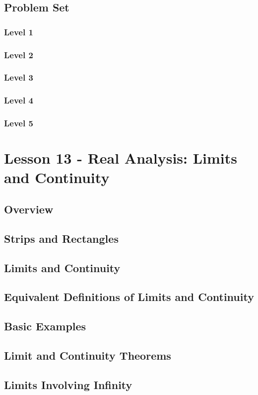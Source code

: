 \documentclass{article}
\begin{document}
\subsection{Problem Set}
\subsubsection{Level 1}
\subsubsection{Level 2}
\subsubsection{Level 3}
\subsubsection{Level 4}
\subsubsection{Level 5}
\pagebreak

\section{Lesson 13 - Real Analysis: Limits and Continuity}
\subsection{Overview}
\subsection{Strips and Rectangles}
\subsection{Limits and Continuity}
\subsection{Equivalent Definitions of Limits and Continuity}
\subsection{Basic Examples}
\subsection{Limit and Continuity Theorems}
\subsection{Limits Involving Infinity}
\end{document}
